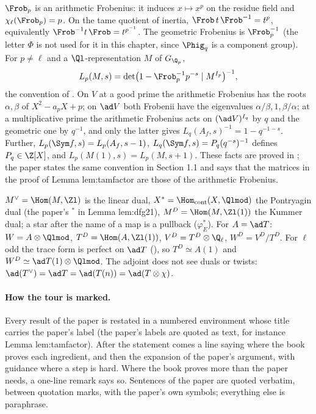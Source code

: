 \begin{sloppypar}
\begin{convention}\label{conv:paper:frobenius}
$\Frob_p$ is an arithmetic Frobenius: it induces $x\mapsto x^p$ on the residue field and $\chi_\ell(\Frob_p)=p$. On the tame quotient of inertia,
$\Frob\, t\,\Frob^{-1}=t^p$, equivalently $\Frob^{-1}t\,\Frob=t^{p^{-1}}$. The geometric Frobenius is $\Frob_p^{-1}$ (the letter $\Phi$ is not used for it in this
chapter, since $\Phig_q$ is a component group). For $p\ne\ell$ and a $\Ql$-representation $M$ of $G_{\Q_p}$,
\[
L_p(M,s)=\det\bigl(1-\Frob_p^{-1}p^{-s}\mid M^{I_p}\bigr)^{-1},
\]
the convention of \cite[Sections 1.1.1, 1.7.2]{DFG04}. On $V$ at a good prime the arithmetic Frobenius has the roots $\alpha,\beta$ of $X^2-a_pX+p$; on $\ad V$ both
Frobenii have the eigenvalues $\alpha/\beta,1,\beta/\alpha$; at a multiplicative prime the arithmetic Frobenius acts on $(\ad V)^{I_q}$ by $q$ and the geometric one by $q^{-1}$,
and only the latter gives $L_q(A_f,s)^{-1}=1-q^{-1-s}$. Further, $L_p(\Sym f,s)=L_p(A_f,s-1)$, $L_q(\Sym f,s)=P_q(q^{-s})^{-1}$ defines $P_q\in\Z[X]$, and
$L_p(M(1),s)=L_p(M,s+1)$. These facts are proved in ; the paper states the same convention in Section 1.1 and says that the
matrices in the proof of Lemma lem:tamfactor are those of the arithmetic Frobenius.
\end{convention}

\begin{convention}[duals]\label{conv:paper:duals}
$M^\vee=\Hom(M,\Zl)$ is the linear dual, $X^*=\Hom_{\mathrm{cont}}(X,\Qlmod)$ the Pontryagin dual (the paper's ${}^*$ in Lemma lem:dfg21), $M^D=\Hom(M,\Zl(1))$ the Kummer
dual; a star after the name of a map is a pullback ($\varphi_E^*$). For $A=\ad T$: $W=A\otimes\Qlmod$, $T^D=\Hom(A,\Zl(1))$, $V^D=T^D\otimes\Q_\ell$, $W^D=V^D/T^D$. For $\ell$
odd the trace form is perfect on $\ad T$ (), so $T^D\simeq A(1)$ and $W^D\simeq\ad T(1)\otimes\Qlmod$. The adjoint does not see duals or twists:
$\ad(T^\vee)=\ad T=\ad(T(n))=\ad(T\otimes\chi)$.
\end{convention}

\paragraph{How the tour is marked.} Every result of the paper is restated in a numbered environment whose title carries the paper's label (the
paper's labels are quoted as text, for instance Lemma lem:tamfactor). After the statement comes a line saying where the book proves each
ingredient, and then the expansion of the paper's argument, with guidance where a step is hard. Where the book proves more than the paper needs, a one-line
remark says so. Sentences of the paper are quoted verbatim, between quotation marks, with the paper's own symbols; everything else is paraphrase.


\end{sloppypar}
